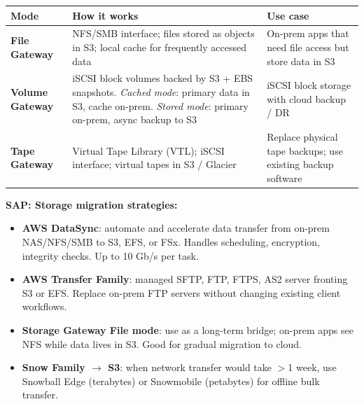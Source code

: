 \begin{comparebox}[title={Storage Gateway modes}]
\begin{tabular}{@{}p{3.2cm}p{4.5cm}p{4.2cm}@{}}
\toprule
\textbf{Mode} & \textbf{How it works} & \textbf{Use case} \\
\midrule
\textbf{File Gateway}   & NFS/SMB interface; files stored as objects in S3;
                          local cache for frequently accessed data &
  On-prem apps that need file access but store data in S3 \\[4pt]
\textbf{Volume Gateway} & iSCSI block volumes backed by S3 + EBS snapshots.
                          \emph{Cached mode}: primary data in S3, cache on-prem.
                          \emph{Stored mode}: primary on-prem, async backup to S3 &
  iSCSI block storage with cloud backup / DR \\[4pt]
\textbf{Tape Gateway}   & Virtual Tape Library (VTL); iSCSI interface; virtual tapes in S3 / Glacier &
  Replace physical tape backups; use existing backup software \\
\bottomrule
\end{tabular}
\end{comparebox}

\begin{sapdepth}
\textbf{SAP: Storage migration strategies:}
\begin{itemize}
  \item \textbf{AWS DataSync}: automate and accelerate data transfer from on-prem NAS/NFS/SMB to
        S3, EFS, or FSx. Handles scheduling, encryption, integrity checks. Up to 10 Gb/s per task.
  \item \textbf{AWS Transfer Family}: managed SFTP, FTP, FTPS, AS2 server fronting S3 or EFS.
        Replace on-prem FTP servers without changing existing client workflows.
  \item \textbf{Storage Gateway File mode}: use as a long-term bridge; on-prem apps see NFS
        while data lives in S3. Good for gradual migration to cloud.
  \item \textbf{Snow Family $\rightarrow$ S3}: when network transfer would take $>$1 week,
        use Snowball Edge (terabytes) or Snowmobile (petabytes) for offline bulk transfer.
\end{itemize}
\end{sapdepth}
